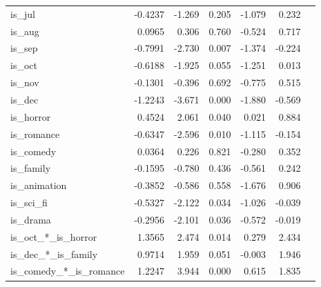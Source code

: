 \documentclass[10pt]{article}
\begin{document}
\begin{table}[H]
\begin{threeparttable}
\begin{tabular}{lrrrrrr}
		is\_jul                      &      -0.4237       &    -1.269  &         0.205        &       -1.079    &        0.232     \\
		is\_aug                      &       0.0965       &     0.306  &         0.760        &       -0.524    &        0.717     \\
		is\_sep                      &      -0.7991       &    -2.730  &         0.007        &       -1.374    &       -0.224     \\
		is\_oct                      &      -0.6188       &    -1.925  &         0.055        &       -1.251    &        0.013     \\
		is\_nov                      &      -0.1301       &    -0.396  &         0.692        &       -0.775    &        0.515     \\
		is\_dec                      &      -1.2243       &    -3.671  &         0.000        &       -1.880    &       -0.569     \\
		is\_horror                   &       0.4524      &     2.061  &         0.040        &        0.021    &        0.884     \\
		is\_romance                  &      -0.6347       &    -2.596  &         0.010        &       -1.115    &       -0.154     \\
		is\_comedy                   &       0.0364       &     0.226  &         0.821        &       -0.280    &        0.352     \\
		is\_family                   &      -0.1595       &    -0.780  &         0.436        &       -0.561    &        0.242     \\
		is\_animation                &      -0.3852       &    -0.586  &         0.558        &       -1.676    &        0.906     \\
		is\_sci\_fi                  &      -0.5327       &    -2.122  &         0.034        &       -1.026    &       -0.039     \\
		is\_drama                    &      -0.2956       &    -2.101  &         0.036        &       -0.572    &       -0.019     \\
		is\_oct\_*\_is\_horror       &       1.3565       &     2.474  &         0.014        &        0.279    &        2.434     \\
		is\_dec\_*\_is\_family       &       0.9714       &     1.959  &         0.051        &       -0.003    &        1.946     \\
		is\_comedy\_*\_is\_romance   &       1.2247       &     3.944  &         0.000        &        0.615    &        1.835     \\

\end{tabular}
\end{threeparttable}
\end{table}
\end{document}
